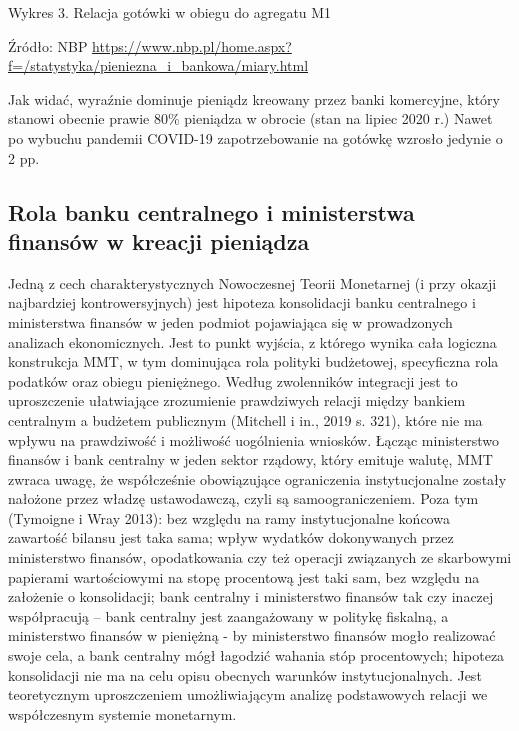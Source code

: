 \documentclass[
]{book}
\begin{document}
Wykres 3. Relacja gotówki w obiegu do agregatu M1

Źródło: NBP \url{https://www.nbp.pl/home.aspx?f=/statystyka/pieniezna_i_bankowa/miary.html}

Jak widać, wyraźnie dominuje pieniądz kreowany przez banki komercyjne, który stanowi obecnie prawie 80\% pieniądza w obrocie (stan na lipiec 2020 r.) Nawet po wybuchu pandemii COVID-19 zapotrzebowanie na gotówkę wzrosło jedynie o 2 pp.~

\hypertarget{rola-banku-centralnego-i-ministerstwa-finansuxf3w-w-kreacji-pieniux105dza}{%
\subsection{Rola banku centralnego i ministerstwa finansów w kreacji pieniądza}\label{rola-banku-centralnego-i-ministerstwa-finansuxf3w-w-kreacji-pieniux105dza}}

Jedną z cech charakterystycznych Nowoczesnej Teorii Monetarnej (i przy okazji najbardziej kontrowersyjnych) jest hipoteza konsolidacji banku centralnego i ministerstwa finansów w jeden podmiot pojawiająca się w prowadzonych analizach ekonomicznych. Jest to punkt wyjścia, z którego wynika cała logiczna konstrukcja MMT, w tym dominująca rola polityki budżetowej, specyficzna rola podatków oraz obiegu pieniężnego. Według zwolenników integracji jest to uproszczenie ułatwiające zrozumienie prawdziwych relacji między bankiem centralnym a budżetem publicznym (Mitchell i in., 2019 s. 321), które nie ma wpływu na prawdziwość i możliwość uogólnienia wniosków. Łącząc ministerstwo finansów i bank centralny w jeden sektor rządowy, który emituje walutę, MMT zwraca uwagę, że współcześnie obowiązujące ograniczenia instytucjonalne zostały nałożone przez władzę ustawodawczą, czyli są samoograniczeniem. Poza tym (Tymoigne i Wray 2013):
bez względu na ramy instytucjonalne końcowa zawartość bilansu jest taka sama;
wpływ wydatków dokonywanych przez ministerstwo finansów, opodatkowania czy też operacji związanych ze skarbowymi papierami wartościowymi na stopę procentową jest taki sam, bez względu na założenie o konsolidacji;
bank centralny i ministerstwo finansów tak czy inaczej współpracują -- bank centralny jest zaangażowany w politykę fiskalną, a ministerstwo finansów w pieniężną - by ministerstwo finansów mogło realizować swoje cela, a bank centralny mógł łagodzić wahania stóp procentowych;
hipoteza konsolidacji nie ma na celu opisu obecnych warunków instytucjonalnych. Jest teoretycznym uproszczeniem umożliwiającym analizę podstawowych relacji we współczesnym systemie monetarnym.
\end{document}
